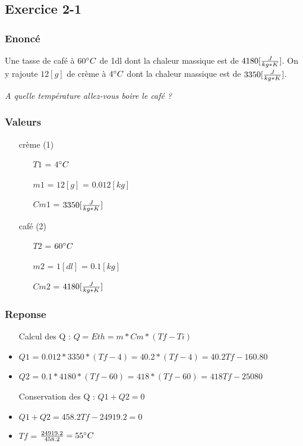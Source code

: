 
\subsection{Exercice 2-1}
\subsubsection{Enoncé}
Une tasse de café à $60\celsius$ de 1dl dont la chaleur massique est de $4180[\cm]$. On y rajoute $12[g]$ de crème à $4\celsius$ dont la chaleur massique est de $3350[\cm]$.

\textit{A quelle température allez-vous boire le café ?}
\subsubsection{Valeurs}
\begin{itemize}
    \item[crème] (1)
    \item[] 
    \begin{itemize}
        \item[$T1$] = $4\celsius$
        \item[$m1$] = $12[g]$ = $0.012[kg]$
        \item[$Cm1$] = $3350[\cm]$
    \end{itemize} 
    \item[café] (2)
    \item[] 
    \begin{itemize}
        \item[$T2$] = $60\celsius$
        \item[$m2$] = $1[dl]$ = $0.1[kg]$
        \item[$Cm2$] = $4180[\cm]$   
    \end{itemize} 
\end{itemize}
\subsubsection{Reponse}
\begin{itemize}
    \item[Calcul des Q] : $Q = Eth = m * Cm * (Tf-Ti)$
    \item $Q1$ = $0.012 * 3350 * (Tf - 4) = 40.2 * (Tf-4) = 40.2Tf - 160.80$
    \item $Q2$ = $0.1 * 4180 * (Tf - 60)$ = $418 * (Tf - 60)$ = $418Tf - 25080$
    \item[Conservation des Q] : $Q1 + Q2 = 0$
    \item $Q1 + Q2 = 458.2Tf - 24919.2 = 0$
    \item $Tf$ = $\frac{24919.2}{458.2} = 55\celsius $
\end{itemize}

